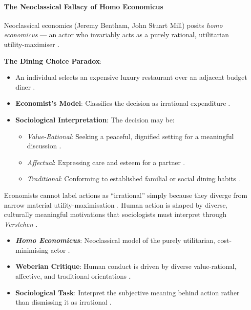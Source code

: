 \paragraph{The Neoclassical Fallacy of Homo Economicus}
Neoclassical economics (Jeremy Bentham, John Stuart Mill) posits \textit{homo economicus} --- an actor who invariably acts as a purely rational, utilitarian utility-maximiser .

\begin{ExampleBox}
\textbf{The Dining Choice Paradox}:
\begin{itemize}
    \item An individual selects an expensive luxury restaurant over an adjacent budget diner .
    \item \textbf{Economist's Model}: Classifies the decision as irrational expenditure .
    \item \textbf{Sociological Interpretation}: The decision may be:
    \begin{itemize}
        \item \textit{Value-Rational}: Seeking a peaceful, dignified setting for a meaningful discussion .
        \item \textit{Affectual}: Expressing care and esteem for a partner .
        \item \textit{Traditional}: Conforming to established familial or social dining habits .
    \end{itemize}
\end{itemize}
\end{ExampleBox}

Economists cannot label actions as ``irrational'' simply because they diverge from narrow material utility-maximisation . Human action is shaped by diverse, culturally meaningful motivations that sociologists must interpret through \textit{Verstehen} .

\begin{QuickRevision}
\begin{itemize}
    \item \textbf{\textit{Homo Economicus}}: Neoclassical model of the purely utilitarian, cost-minimising actor .
    \item \textbf{Weberian Critique}: Human conduct is driven by diverse value-rational, affective, and traditional orientations .
    \item \textbf{Sociological Task}: Interpret the subjective meaning behind action rather than dismissing it as irrational .
\end{itemize}
\end{QuickRevision}

